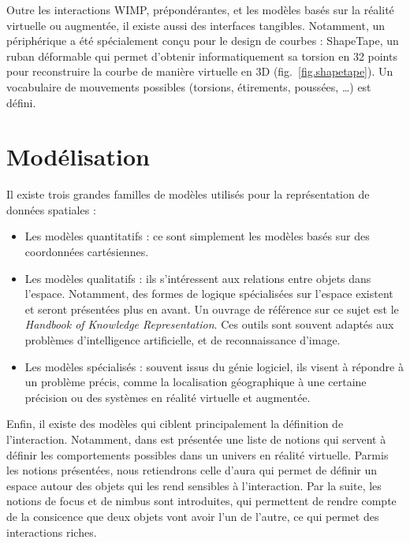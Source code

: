 \documentclass[french,12pt]{article}
\begin{document}
Outre les interactions \ac{WIMP}, prépondérantes, et les modèles basés sur la réalité virtuelle ou augmentée, il existe aussi des interfaces tangibles. Notamment, un périphérique a été spécialement conçu pour le design de courbes : ShapeTape\cite{grossman_interface_2003}, un ruban déformable qui permet d'obtenir informatiquement sa torsion en 32 points pour reconstruire la courbe de manière virtuelle en 3D (fig.~\ref{fig.shapetape}). Un vocabulaire de mouvements possibles (torsions, étirements, poussées, \dots) est défini.




\newpage
\section{Modélisation}
Il existe trois grandes familles de modèles utilisés pour la représentation de données spatiales : 
\begin{itemize}
\item Les modèles quantitatifs : ce sont simplement les modèles basés sur des coordonnées cartésiennes. 
\item Les modèles qualitatifs : ils s'intéressent aux relations entre objets dans l'espace. Notamment, des formes de logique spécialisées sur l'espace existent et seront présentées plus en avant. Un ouvrage de référence sur ce sujet est le \textit{Handbook of Knowledge Representation}\cite{porter_handbook_2008}. Ces outils sont souvent adaptés aux problèmes d'intelligence artificielle, et de reconnaissance d'image.
\item Les modèles spécialisés : souvent issus du génie logiciel, ils visent à répondre à un problème précis, comme la localisation géographique à une certaine précision ou des systèmes en réalité virtuelle et augmentée.
\end{itemize}

Enfin, il existe des modèles qui ciblent principalement la définition de l'interaction. Notamment, dans \cite{benford_spatial_1993} est présentée une liste de notions qui servent 
à définir les comportements possibles dans un univers en réalité virtuelle. Parmis les notions présentées, nous retiendrons celle d'aura qui permet de définir un espace autour des 
objets qui les rend sensibles à l'interaction. Par la suite, les notions de focus et de nimbus sont introduites, qui permettent de rendre compte 
de la consicence que deux objets vont avoir l'un de l'autre, ce qui permet des interactions riches.
\end{document}
